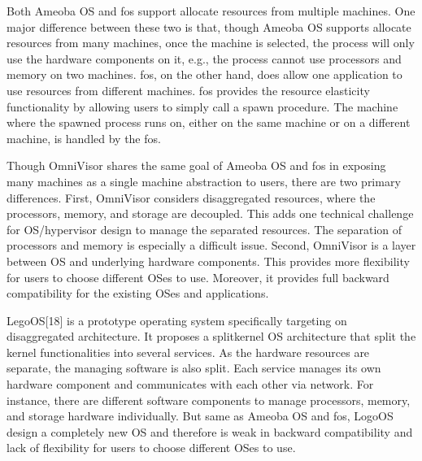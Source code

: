 \documentclass[twocolumn]{article}
\begin{document}
    Both Ameoba OS and fos support allocate resources from multiple machines. One major difference between these two is that, though Ameoba OS supports allocate resources from many machines, once the machine is selected, the process will only use the hardware components on it, e.g., the process cannot use processors and memory on two machines.  fos, on the other hand, does allow one application to use resources from different machines. fos provides the resource elasticity functionality by allowing users to simply call a spawn procedure. The machine where the spawned process runs on, either on the same machine or on a different machine, is handled by the fos. \par
    Though OmniVisor shares the same goal of Ameoba OS and fos in exposing many machines as a single machine abstraction to users, there are two primary differences. First, OmniVisor considers disaggregated resources, where the processors, memory, and storage are decoupled. This adds one technical challenge for OS/hypervisor design to manage the separated resources. The separation of processors and memory is especially a difficult issue. Second, OmniVisor is a layer between OS and underlying hardware components. This provides more flexibility for users to choose different OSes to use. Moreover, it provides full backward compatibility for the existing OSes and applications. \par
    LegoOS[18] is a prototype operating system specifically targeting on disaggregated architecture. It proposes a splitkernel OS architecture that split the kernel functionalities into several services. As the hardware resources are separate, the managing software is also split. Each service manages its own hardware component and communicates with each other via network. For instance, there are different software components to manage processors, memory, and storage hardware individually. But same as Ameoba OS and fos, LogoOS design a completely new OS and therefore is weak in backward compatibility and lack of flexibility for users to choose different OSes to use. \par
\end{document}
